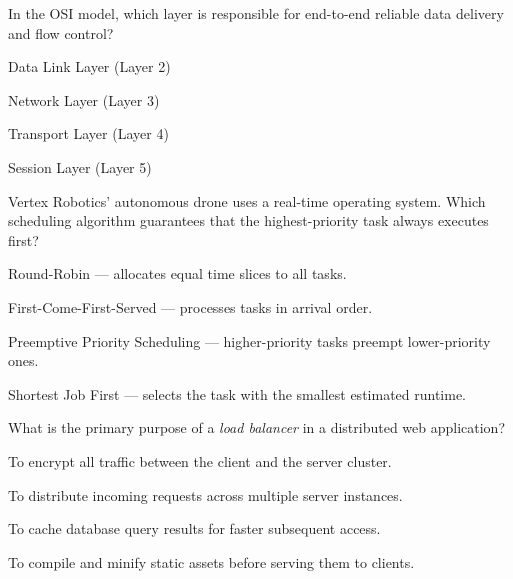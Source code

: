 \documentclass[11pt,a4paper]{article}
\begin{document}
\begin{questionblock}
 In the OSI model, which layer is responsible for end-to-end reliable data delivery and flow control?
\begin{mcoptions}
  \item[\textbf{A.}] Data Link Layer (Layer 2)
  \item[\textbf{B.}] Network Layer (Layer 3)
  \item[\textbf{C.}] Transport Layer (Layer 4)
  \item[\textbf{D.}] Session Layer (Layer 5)
\end{mcoptions}
\end{questionblock}

\begin{questionblock}
 Vertex Robotics' autonomous drone uses a real-time operating system. Which scheduling algorithm guarantees that the highest-priority task always executes first?
\begin{mcoptions}
  \item[\textbf{A.}] Round-Robin --- allocates equal time slices to all tasks.
  \item[\textbf{B.}] First-Come-First-Served --- processes tasks in arrival order.
  \item[\textbf{C.}] Preemptive Priority Scheduling --- higher-priority tasks preempt lower-priority ones.
  \item[\textbf{D.}] Shortest Job First --- selects the task with the smallest estimated runtime.
\end{mcoptions}
\end{questionblock}

\begin{questionblock}
 What is the primary purpose of a \emph{load balancer} in a distributed web application?
\begin{mcoptions}
  \item[\textbf{A.}] To encrypt all traffic between the client and the server cluster.
  \item[\textbf{B.}] To distribute incoming requests across multiple server instances.
  \item[\textbf{C.}] To cache database query results for faster subsequent access.
  \item[\textbf{D.}] To compile and minify static assets before serving them to clients.
\end{mcoptions}
\end{questionblock}
\end{document}
